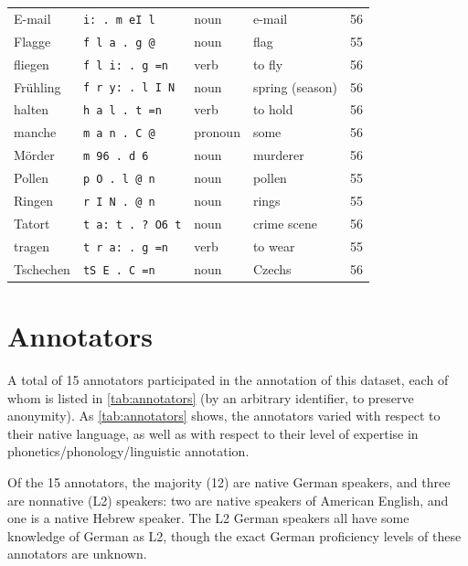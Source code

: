 \begin{table}[htb]
\begin{tabular}{llllc}
		\midrule
		E-mail		&	\texttt{i:~.~m eI l} 		&	noun &	e-mail %
			&	56	\\
		Flagge		&	\texttt{f l a~.~g @} 		&	noun &	 flag %
			&	55	\\
		fliegen		&	\texttt{f l i:~.~g =n} 	&	verb &	to fly %
			& 56	\\
		Frühling	&	\texttt{f r y:~.~l I N} 		& noun	&	spring \newline (season) %
			&	56	\\
		halten		&	\texttt{h a l~.~t =n}		&	verb &	to hold %
			&	56	\\
		manche	&	\texttt{m a n~.~C @} 		&	pronoun &	some %
			&	56	\\
		Mörder		&	\texttt{m 96~.~d 6}		&	noun &	murderer %
			&	56	\\
		Pollen		&	\texttt{p O~.~l @ n} 		&	noun &	pollen %
			& 	55	\\
		Ringen		&	\texttt{r I N~.~@ n}		&	noun &	rings %
			&	55	\\
		Tatort		&	\texttt{t a:~t~.~?~O6 t}	&	noun &	crime scene %
			&	56	\\
		tragen		&	\texttt{t r a:~.~g =n} 	&	verb &	to wear %
			&	55	\\
		Tschechen	& \texttt{tS E~.~C =n}	& noun	&	Czechs	%
			& 56	\\
		\bottomrule
		\end{tabular}
		\label{tab:bisyllwords}
	\end{table}
	
	\section{Annotators}
	\label{sec:lexstress:annotators}
	
	A total of 15 annotators participated in the annotation of this dataset,
	each of whom is listed in \cref{tab:annotators} (by an arbitrary identifier, to preserve anonymity).
	As \cref{tab:annotators} shows, the annotators varied with respect to their native language, as well as with respect to their level of expertise in phonetics/phonology/linguistic annotation. 
	 
	Of the 15 annotators, the majority (12) are native German speakers, and three are nonnative (L2) speakers: two are native speakers of American English, and one is a native Hebrew speaker. The L2 German speakers all have some knowledge of German as L2, though the exact German proficiency levels of these annotators are unknown.
	
